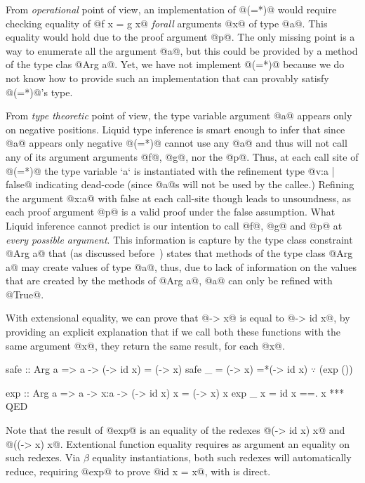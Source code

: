 From \textit{operational} point of view,
an implementation of @(=*)@ would require checking
equality of @f x = g x@ \textit{forall} arguments @x@ of type @a@.
%
This equality would hold due to the proof argument @p@.
%
The only missing point is a way to enumerate all the argument @a@,
but this could be provided by a method of the type clas @Arg a@.
%
Yet, we have not implement @(=*)@ because we do not know how to
provide such an implementation that can provably satisfy @(=*)@'s type.

From \textit{type theoretic} point of view,
the type variable argument @a@
appears only on negative positions.
%
Liquid type inference is smart enough to infer that
since @a@ appears only negative @(=*)@ cannot use any @a@
and thus will not call any of its argument arguments @f@, @g@, nor the @p@.
%
Thus, at each call site of @(=*)@ the type variable `a` is instantiated
with the refinement type @{v:a | false}@ indicating dead-code
(since @a@s will not be used by the callee.)
%
Refining the argument @x:a@ with false at each call-site though
leads to unsoundness, as each proof argument @p@ is a valid proof under
the false assumption.
%
What Liquid inference cannot predict is our intention to call
@f@, @g@ and @p@ at \textit{every possible argument}.
%
This information is capture by the type class constraint @Arg a@
that (as discussed before~\citep{Vazou13}) states that methods of
the type class
@Arg a@ may create values of type @a@, thus,
due to lack of information on the values that are created by the
methods of @Arg a@, @a@ can only be refined with @True@.

With extensional equality, we can prove
that @\x -> x@ is equal to @\x -> id x@,
by providing an explicit explanation that
if we call both these functions with the same
argument @x@, they return the same result, for each @x@.
%
\begin{mcode}
 safe :: Arg a => a
       -> {(\x -> id x) = (\x -> x)}
 safe _  = (\x -> x)
         =*(\x -> id x) $\because$ (exp ())

 exp :: Arg a => a -> x:a
     -> {(\x -> id x) x = (\x -> x) x}
 exp _ x =  id x
         ==. x
         *** QED
\end{mcode}
%
Note that the result of @exp@
is an equality of the redexes
@(\x -> id x) x@ and @((\x -> x) x@.
%
Extentional function equality requires
as argument an equality on such redexes.
%
Via $\beta$ equality instantiations,
both such redexes will automatically reduce,
requiring @exp@ to prove @id x = x@,
with is direct.

